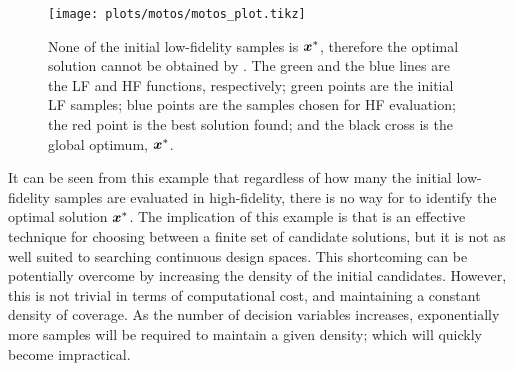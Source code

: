 \begin{figure}[h!]
  \centering
  \texttt{[image: plots/motos/motos\_plot.tikz]} 
  \caption{None of the initial low-fidelity samples is $\boldsymbol{x}^*$, therefore the optimal solution cannot be obtained by \motos{}. The green and the blue lines are the LF and HF functions, respectively; green points are the initial LF samples; blue points are the samples chosen for HF evaluation; the red point is the best solution found; and the black cross is the global optimum, $\boldsymbol{x}^*$.} 
    \label{fig:motos-example}
\end{figure}
It can be seen from this example that regardless of how many the initial low-fidelity samples are evaluated in high-fidelity, there is no way for \motos{} to identify the optimal solution $\boldsymbol{x}^*$. The implication of this example is that \motos{} is an effective technique for choosing between a finite set of candidate solutions, but it is not as well suited to searching continuous design spaces. This shortcoming can be potentially overcome by increasing the density of the initial candidates. However, this is not trivial in terms of computational cost, and maintaining a constant density of coverage. As the number of decision variables increases, exponentially more samples will be required to maintain a given density; which will quickly become impractical.
